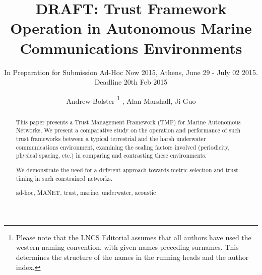 \documentclass[runningheads,a4paper]{llncs}
\newcommand{\keywords}[1]{\par\addvspace\baselineskip
\noindent\keywordname\enspace\ignorespaces#1}
\begin{document}
\mainmatter  %

\title{DRAFT: Trust Framework Operation in Autonomous Marine Communications Environments}
\subtitle{In Preparation for Submission Ad-Hoc Now 2015, Athens, June 29 - July 02 2015. Deadline 20th Feb 2015}


%
%
\author{Andrew Bolster%
\thanks{Please note that the LNCS Editorial assumes that all authors have used
the western naming convention, with given names preceding surnames. This determines
the structure of the names in the running heads and the author index.}
, Alan Marshall, Ji Guo}
%


\maketitle   

\begin{abstract}
  This paper presents a Trust Management Framework (TMF) for Marine Autonomous Networks, 
  We present a comparative study on the operation and performance of such trust frameworks between a typical terrestrial and the harsh underwater communications environment, examining the scaling factors involved (periodicity, physical spacing, etc.) in comparing and contrasting these environments.

  We demonstrate the need for a different approach towards metric selection and trust-timing in such constrained networks.
  \keywords{ad-hoc, MANET, trust, marine, underwater, acoustic}
\end{abstract}
\end{document}
